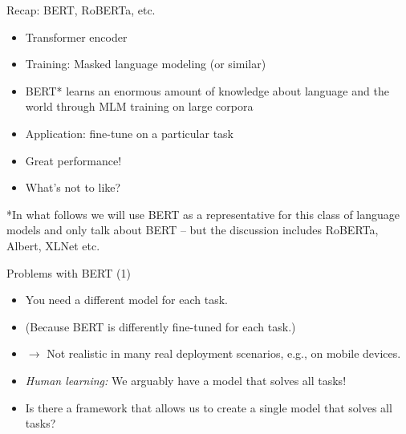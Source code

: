 \begin{frame}{Recap: BERT, RoBERTa, etc.}

\vfill

  \begin{itemize}
\item Transformer encoder
\item Training: Masked language modeling (or similar)
\item BERT* learns an enormous amount of knowledge
about language and the world through MLM training on large corpora
\item Application: fine-tune on a particular task
\item Great performance!
\item \ques What's not to like?
    \end{itemize}

\vfill

*\scriptsize{In what follows we will use BERT as a representative for this class of language models and only talk about BERT -- but the discussion includes RoBERTa, Albert, XLNet etc.}

\end{frame}


\begin{frame}{Problems with BERT (1)}

\vfill

  \begin{itemize}
\item You need a different model for each task.
\item[] (Because BERT is differently fine-tuned for each task.)
\item[] $\to$ Not realistic in many real deployment scenarios, e.g., on mobile devices.
\item \textit{Human learning:} We arguably have a  model that solves all tasks!
\item \ques Is there a framework that allows us to create a single model that solves all tasks?
    \end{itemize}

\vfill

\end{frame}


